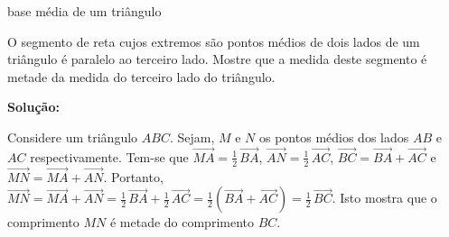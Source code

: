 \clearpage
\begin{example}{ base média de um triângulo}

O segmento de reta cujos extremos são pontos médios de dois lados de um triângulo é paralelo ao terceiro lado. Mostre que a medida deste segmento é metade da medida do terceiro lado do triângulo.

\textbf{Solução:}

Considere um triângulo \(ABC\). Sejam, \(M\) e \(N\) os pontos médios dos lados \(AB\) e \(AC\) respectivamente. Tem-se que \(\overrightarrow{MA} = \frac{1}{2} \, \overrightarrow{BA}\), \(\overrightarrow{AN} = \frac{1}{2} \, \overrightarrow{AC}\),
\(\overrightarrow{BC} = \overrightarrow{BA} + \overrightarrow{AC}\) e \(\overrightarrow{MN} = \overrightarrow{MA} + \overrightarrow{AN}\). Portanto, \(\overrightarrow{MN} = \overrightarrow{MA} + \overrightarrow{AN} =
\frac{1}{2} \, \overrightarrow{BA} + \frac{1}{2} \, \overrightarrow{AC} = \frac{1}{2} \left(\overrightarrow{BA} + \overrightarrow{AC}\right) = \frac{1}{2} \, \overrightarrow{BC}\).
Isto mostra que o comprimento \(MN\) é metade do comprimento \(BC\).

\begin{center}
\end{center}
\end{example}

